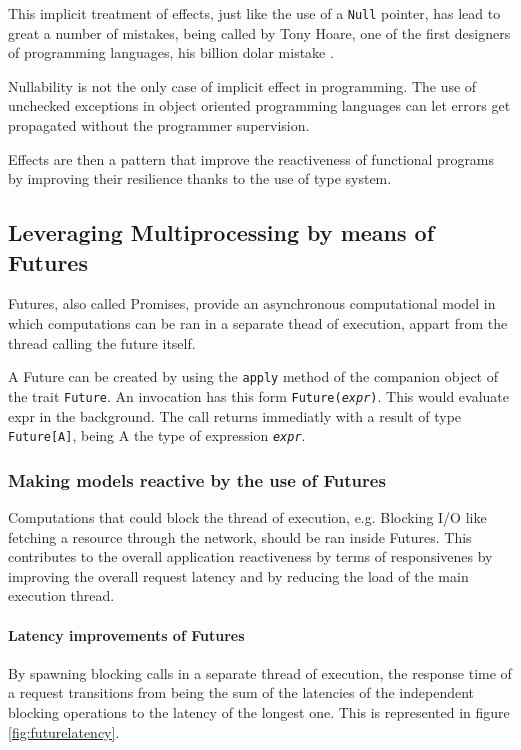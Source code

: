\documentclass[../main.tex]{subfiles}
\begin{document}
This implicit treatment of effects, just like the use of a \texttt{Null} pointer, has
lead to great a number of mistakes, being called by Tony Hoare, one of the first designers of
programming languages, his billion dolar mistake \autocite{NullMistake}.

Nullability is not the only case of implicit effect in programming. The use of unchecked
exceptions in object oriented programming languages can let errors get propagated
without the programmer supervision.

Effects are then a pattern that improve the reactiveness of functional programs by
improving their resilience thanks to the use of type system.

\subsection{Leveraging Multiprocessing by means of Futures}
Futures, also called Promises, provide an asynchronous computational model in
which computations can be ran in a separate thead of execution, appart from the
thread calling the future itself.

A Future can be created by using the \texttt{apply} method of the companion object
of the trait \texttt{Future}. An invocation has this form
\texttt{Future(\textit{expr})}. This would evaluate expr in the background. The
call returns immediatly with a result of type \texttt{Future[A]}, being A the type
of expression \texttt{\textit{expr}}.

\subsubsection{Making models reactive by the use of Futures}

Computations that could block the thread of execution, e.g. Blocking I/O like
fetching a resource through the network, should be ran inside Futures. This
contributes to the overall application reactiveness by terms of responsivenes by
improving the overall request latency and by reducing the load of the main
execution thread.

\paragraph{Latency improvements of Futures}

By spawning blocking calls in a separate thread of execution, the response time of
a request transitions from being the sum of the latencies of the independent
blocking operations to the latency of the longest one. This is represented in
figure \ref{fig:futurelatency}.
\end{document}
